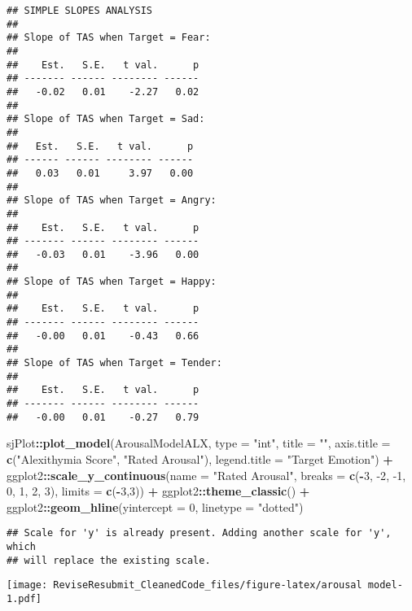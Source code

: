 \documentclass[]{article}
\newenvironment{Shaded}{\begin{snugshade}}{\end{snugshade}}
\newcommand{\DataTypeTok}[1]{\textcolor[rgb]{0.13,0.29,0.53}{#1}}
\newcommand{\DecValTok}[1]{\textcolor[rgb]{0.00,0.00,0.81}{#1}}
\newcommand{\KeywordTok}[1]{\textcolor[rgb]{0.13,0.29,0.53}{\textbf{#1}}}
\newcommand{\NormalTok}[1]{#1}
\newcommand{\OperatorTok}[1]{\textcolor[rgb]{0.81,0.36,0.00}{\textbf{#1}}}
\newcommand{\StringTok}[1]{\textcolor[rgb]{0.31,0.60,0.02}{#1}}
\begin{document}
\begin{verbatim}
## SIMPLE SLOPES ANALYSIS 
## 
## Slope of TAS when Target = Fear: 
## 
##    Est.   S.E.   t val.      p
## ------- ------ -------- ------
##   -0.02   0.01    -2.27   0.02
## 
## Slope of TAS when Target = Sad: 
## 
##   Est.   S.E.   t val.      p
## ------ ------ -------- ------
##   0.03   0.01     3.97   0.00
## 
## Slope of TAS when Target = Angry: 
## 
##    Est.   S.E.   t val.      p
## ------- ------ -------- ------
##   -0.03   0.01    -3.96   0.00
## 
## Slope of TAS when Target = Happy: 
## 
##    Est.   S.E.   t val.      p
## ------- ------ -------- ------
##   -0.00   0.01    -0.43   0.66
## 
## Slope of TAS when Target = Tender: 
## 
##    Est.   S.E.   t val.      p
## ------- ------ -------- ------
##   -0.00   0.01    -0.27   0.79
\end{verbatim}

\begin{Shaded}
\begin{Highlighting}[]
\NormalTok{sjPlot}\OperatorTok{::}\KeywordTok{plot_model}\NormalTok{(ArousalModelALX, }
                   \DataTypeTok{type =} \StringTok{"int"}\NormalTok{,}
                   \DataTypeTok{title =} \StringTok{""}\NormalTok{,}
                   \DataTypeTok{axis.title =} \KeywordTok{c}\NormalTok{(}\StringTok{"Alexithymia Score"}\NormalTok{, }\StringTok{"Rated Arousal"}\NormalTok{),}
                   \DataTypeTok{legend.title =} \StringTok{"Target Emotion"}\NormalTok{) }\OperatorTok{+}\StringTok{ }
\NormalTok{ggplot2}\OperatorTok{::}\KeywordTok{scale_y_continuous}\NormalTok{(}\DataTypeTok{name =} \StringTok{"Rated Arousal"}\NormalTok{, }\DataTypeTok{breaks =} \KeywordTok{c}\NormalTok{(}\OperatorTok{-}\DecValTok{3}\NormalTok{, }\DecValTok{-2}\NormalTok{, }\DecValTok{-1}\NormalTok{, }\DecValTok{0}\NormalTok{, }\DecValTok{1}\NormalTok{, }\DecValTok{2}\NormalTok{, }\DecValTok{3}\NormalTok{), }\DataTypeTok{limits =} \KeywordTok{c}\NormalTok{(}\OperatorTok{-}\DecValTok{3}\NormalTok{,}\DecValTok{3}\NormalTok{)) }\OperatorTok{+}
\StringTok{  }\NormalTok{ggplot2}\OperatorTok{::}\KeywordTok{theme_classic}\NormalTok{() }\OperatorTok{+}
\StringTok{  }\NormalTok{ggplot2}\OperatorTok{::}\KeywordTok{geom_hline}\NormalTok{(}\DataTypeTok{yintercept =} \DecValTok{0}\NormalTok{, }\DataTypeTok{linetype =} \StringTok{"dotted"}\NormalTok{)     }
\end{Highlighting}
\end{Shaded}

\begin{verbatim}
## Scale for 'y' is already present. Adding another scale for 'y', which
## will replace the existing scale.
\end{verbatim}

\texttt{[image: ReviseResubmit\_CleanedCode\_files/figure-latex/arousal model-1.pdf]}
\end{document}
